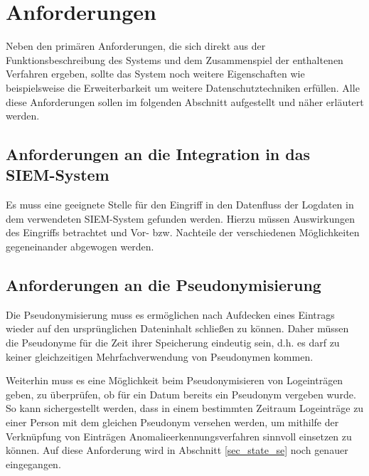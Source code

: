 \section{Anforderungen}

\label{sec_impl_requirements}

Neben den primären Anforderungen, die sich direkt aus der Funktionsbeschreibung des Systems und dem Zusammenspiel der enthaltenen Verfahren ergeben, sollte das System noch weitere Eigenschaften wie beispielsweise die Erweiterbarkeit um weitere Datenschutztechniken erfüllen. Alle diese Anforderungen sollen im folgenden Abschnitt aufgestellt und näher erläutert werden.

\subsection{Anforderungen an die Integration in das SIEM-System}

\label{subsec_impl_requirements_ossimintegration}

Es muss eine geeignete Stelle für den Eingriff in den Datenfluss der Logdaten in dem verwendeten SIEM-System gefunden werden. Hierzu müssen Auswirkungen des Eingriffs betrachtet und Vor- bzw. Nachteile der verschiedenen Möglichkeiten gegeneinander abgewogen werden. 

\subsection{Anforderungen an die Pseudonymisierung}

\label{subsec_impl_requirements_pseudonymity}


Die Pseudonymisierung muss es ermöglichen nach Aufdecken eines Eintrags wieder auf den ursprünglichen Dateninhalt schließen zu können. Daher müssen die Pseudonyme für die Zeit ihrer Speicherung eindeutig sein, d.h. es darf zu keiner gleichzeitigen Mehrfachverwendung von Pseudonymen kommen. 

Weiterhin muss es eine Möglichkeit beim Pseudonymisieren von Logeinträgen geben, zu überprüfen, ob für ein Datum bereits ein Pseudonym vergeben wurde. So kann sichergestellt werden, dass in einem bestimmten Zeitraum Logeinträge zu einer Person mit dem gleichen Pseudonym versehen werden, um mithilfe der Verknüpfung von Einträgen Anomalieerkennungsverfahren sinnvoll einsetzen zu können. Auf diese Anforderung wird in Abschnitt \ref{sec_state_se} noch genauer eingegangen.

